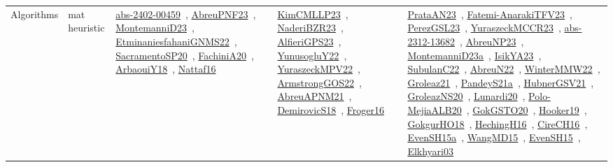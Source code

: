 {\begin{longtable}{lp{3cm}>{\raggedright\arraybackslash}p{6cm}>{\raggedright\arraybackslash}p{6cm}>{\raggedright\arraybackslash}p{8cm}}
\index{mat heuristic}\index{Algorithms!mat heuristic}Algorithms & mat heuristic & \href{../works/abs-2402-00459.pdf}{abs-2402-00459}~\cite{abs-2402-00459}, \href{../works/AbreuPNF23.pdf}{AbreuPNF23}~\cite{AbreuPNF23}, \href{../works/MontemanniD23.pdf}{MontemanniD23}~\cite{MontemanniD23}, \href{../works/EtminaniesfahaniGNMS22.pdf}{EtminaniesfahaniGNMS22}~\cite{EtminaniesfahaniGNMS22}, \href{../works/SacramentoSP20.pdf}{SacramentoSP20}~\cite{SacramentoSP20}, \href{../works/FachiniA20.pdf}{FachiniA20}~\cite{FachiniA20}, \href{../works/ArbaouiY18.pdf}{ArbaouiY18}~\cite{ArbaouiY18}, \href{../works/Nattaf16.pdf}{Nattaf16}~\cite{Nattaf16} & \href{../works/KimCMLLP23.pdf}{KimCMLLP23}~\cite{KimCMLLP23}, \href{../works/NaderiBZR23.pdf}{NaderiBZR23}~\cite{NaderiBZR23}, \href{../works/AlfieriGPS23.pdf}{AlfieriGPS23}~\cite{AlfieriGPS23}, \href{../works/YunusogluY22.pdf}{YunusogluY22}~\cite{YunusogluY22}, \href{../works/YuraszeckMPV22.pdf}{YuraszeckMPV22}~\cite{YuraszeckMPV22}, \href{../works/ArmstrongGOS22.pdf}{ArmstrongGOS22}~\cite{ArmstrongGOS22}, \href{../works/AbreuAPNM21.pdf}{AbreuAPNM21}~\cite{AbreuAPNM21}, \href{../works/DemirovicS18.pdf}{DemirovicS18}~\cite{DemirovicS18}, \href{../works/Froger16.pdf}{Froger16}~\cite{Froger16} & \href{../works/PrataAN23.pdf}{PrataAN23}~\cite{PrataAN23}, \href{../works/Fatemi-AnarakiTFV23.pdf}{Fatemi-AnarakiTFV23}~\cite{Fatemi-AnarakiTFV23}, \href{../works/PerezGSL23.pdf}{PerezGSL23}~\cite{PerezGSL23}, \href{../works/YuraszeckMCCR23.pdf}{YuraszeckMCCR23}~\cite{YuraszeckMCCR23}, \href{../works/abs-2312-13682.pdf}{abs-2312-13682}~\cite{abs-2312-13682}, \href{../works/AbreuNP23.pdf}{AbreuNP23}~\cite{AbreuNP23}, \href{../works/MontemanniD23a.pdf}{MontemanniD23a}~\cite{MontemanniD23a}, \href{../works/IsikYA23.pdf}{IsikYA23}~\cite{IsikYA23}, \href{../works/SubulanC22.pdf}{SubulanC22}~\cite{SubulanC22}, \href{../works/AbreuN22.pdf}{AbreuN22}~\cite{AbreuN22}, \href{../works/WinterMMW22.pdf}{WinterMMW22}~\cite{WinterMMW22}, \href{../works/Groleaz21.pdf}{Groleaz21}~\cite{Groleaz21}, \href{../works/PandeyS21a.pdf}{PandeyS21a}~\cite{PandeyS21a}, \href{../works/HubnerGSV21.pdf}{HubnerGSV21}~\cite{HubnerGSV21}, \href{../works/GroleazNS20.pdf}{GroleazNS20}~\cite{GroleazNS20}, \href{../works/Lunardi20.pdf}{Lunardi20}~\cite{Lunardi20}, \href{../works/Polo-MejiaALB20.pdf}{Polo-MejiaALB20}~\cite{Polo-MejiaALB20}, \href{../works/GokGSTO20.pdf}{GokGSTO20}~\cite{GokGSTO20}, \href{../works/Hooker19.pdf}{Hooker19}~\cite{Hooker19}, \href{../works/GokgurHO18.pdf}{GokgurHO18}~\cite{GokgurHO18}, \href{../works/HechingH16.pdf}{HechingH16}~\cite{HechingH16}, \href{../works/CireCH16.pdf}{CireCH16}~\cite{CireCH16}, \href{../works/EvenSH15a.pdf}{EvenSH15a}~\cite{EvenSH15a}, \href{../works/WangMD15.pdf}{WangMD15}~\cite{WangMD15}, \href{../works/EvenSH15.pdf}{EvenSH15}~\cite{EvenSH15}, \href{../works/Elkhyari03.pdf}{Elkhyari03}~\cite{Elkhyari03}\\

\end{longtable}}
